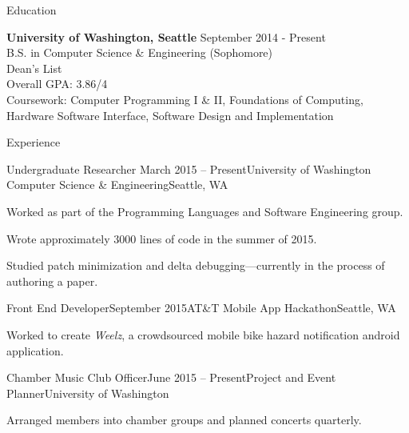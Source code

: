 \documentclass{resume} %
\begin{document}

\begin{rSection}{Education}

  {\bf University of Washington, Seattle} \hfill {September 2014 - Present} \\
  B.S. in Computer Science \& Engineering (Sophomore) \\
  Dean's List \\
  Overall GPA: 3.86/4 \\
  Coursework: Computer Programming I \& II, Foundations of Computing, Hardware Software Interface, Software Design and Implementation

\end{rSection}


\begin{rSection}{Experience}

  \begin{rSubsection}{Undergraduate Researcher}
    {March 2015 -- Present}{University of Washington Computer Science \& Engineering}{Seattle, WA}
  \item Worked as part of the Programming Languages and Software Engineering
    group.
  \item Wrote approximately 3000 lines of code in the summer of 2015.
  \item Studied patch minimization and delta debugging---currently in the process of authoring a paper.
  \end{rSubsection}

  \begin{rSubsection}{Front End Developer}{September 2015}{AT\&T Mobile App Hackathon}{Seattle, WA}
  \item Worked to create \emph{Weelz}, a crowdsourced mobile bike hazard notification android application.
  \end{rSubsection}

  \begin{rSubsection}{Chamber Music Club Officer}{June 2015 -- Present}{Project and Event Planner}{University of Washington}
  \item Arranged members into chamber groups and planned concerts quarterly.
  \end{rSubsection}

\end{rSection}
\end{document}
